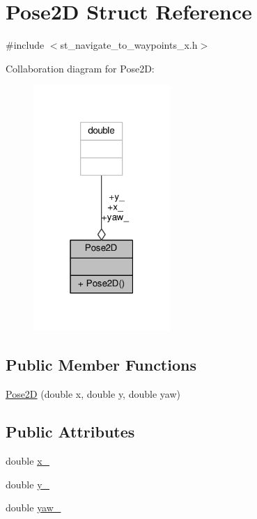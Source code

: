 \hypertarget{structPose2D}{}\section{Pose2D Struct Reference}
\label{structPose2D}


{\ttfamily \#include $<$st\+\_\+navigate\+\_\+to\+\_\+waypoints\+\_\+x.\+h$>$}



Collaboration diagram for Pose2D\+:
\nopagebreak
\begin{figure}[H]
\begin{center}
\leavevmode
\includegraphics[width=147pt]{structPose2D__coll__graph}
\end{center}
\end{figure}
\subsection*{Public Member Functions}
\begin{DoxyCompactItemize}
\item 
\hyperlink{structPose2D_a6b3a01fc654d552596fe441d5bd5c92e}{Pose2D} (double x, double y, double yaw)
\end{DoxyCompactItemize}
\subsection*{Public Attributes}
\begin{DoxyCompactItemize}
\item 
double \hyperlink{structPose2D_aa2f5bc59808d11d801e6b58f57fdd3aa}{x\+\_\+}
\item 
double \hyperlink{structPose2D_a2c31f84b294702b4a82a2c9f44451d54}{y\+\_\+}
\item 
double \hyperlink{structPose2D_a3f0f263a49f611369bcfb06ca9cd5a4d}{yaw\+\_\+}
\end{DoxyCompactItemize}


